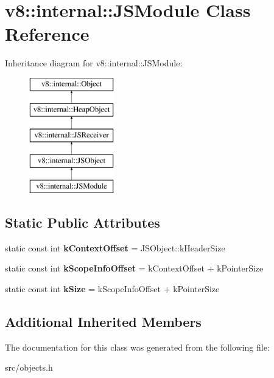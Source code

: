\hypertarget{classv8_1_1internal_1_1_j_s_module}{}\section{v8\+:\+:internal\+:\+:J\+S\+Module Class Reference}
\label{classv8_1_1internal_1_1_j_s_module}
Inheritance diagram for v8\+:\+:internal\+:\+:J\+S\+Module\+:\begin{figure}[H]
\begin{center}
\leavevmode
\includegraphics[height=5.000000cm]{classv8_1_1internal_1_1_j_s_module}
\end{center}
\end{figure}
\subsection*{Static Public Attributes}
\begin{DoxyCompactItemize}
\item 
\hypertarget{classv8_1_1internal_1_1_j_s_module_a9726969c27afae856ac1b2eb59671b55}{}static const int {\bfseries k\+Context\+Offset} = J\+S\+Object\+::k\+Header\+Size\label{classv8_1_1internal_1_1_j_s_module_a9726969c27afae856ac1b2eb59671b55}

\item 
\hypertarget{classv8_1_1internal_1_1_j_s_module_ac143be923b04c13b6145e99b44643225}{}static const int {\bfseries k\+Scope\+Info\+Offset} = k\+Context\+Offset + k\+Pointer\+Size\label{classv8_1_1internal_1_1_j_s_module_ac143be923b04c13b6145e99b44643225}

\item 
\hypertarget{classv8_1_1internal_1_1_j_s_module_acd14eb06c5ad2c3b532f178a7402b71b}{}static const int {\bfseries k\+Size} = k\+Scope\+Info\+Offset + k\+Pointer\+Size\label{classv8_1_1internal_1_1_j_s_module_acd14eb06c5ad2c3b532f178a7402b71b}

\end{DoxyCompactItemize}
\subsection*{Additional Inherited Members}


The documentation for this class was generated from the following file\+:\begin{DoxyCompactItemize}
\item 
src/objects.\+h\end{DoxyCompactItemize}

